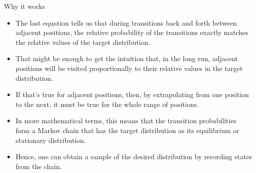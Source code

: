 \documentclass[handout]{beamer}
\begin{document}
\begin{frame}{Why it works}
\scriptsize{

\begin{itemize}
\item The last equation tells us that during transitions back and forth between adjacent positions, the relative probability of the transitions exactly matches the relative values of the target distribution. 
\item That might be enough to get the intuition that, in the
long run, adjacent positions will be visited proportionally to their relative values in the target distribution. 
\item If that's true for adjacent positions, then, by extrapolating from one position to the next, it must be true for the whole range of positions.

\item In more mathematical terms, this means that the transition probabilities form a Markov chain that has the target distribution as its equilibrium or stationary distribution. \cite{wiki:Markov_chain_Monte_Carlo}

\item Hence, one can obtain a sample of the desired distribution by recording states from the chain.


\end{itemize}


} 
\end{frame}
\end{document}
